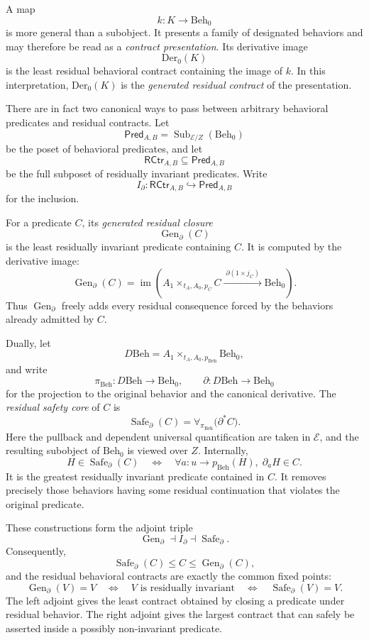A map
\[
  k:K\to \mathrm{Beh}_0
\]
is more general than a subobject.  It presents a family of designated
behaviors and may therefore be read as a \emph{contract presentation}.  Its
derivative image
\[
  \mathrm{Der}_0(K)
\]
is the least residual behavioral contract containing the image of \(k\).  In
this interpretation, \(\mathrm{Der}_0(K)\) is the \emph{generated residual
contract} of the presentation.

There are in fact two canonical ways to pass between arbitrary behavioral
predicates and residual contracts.  Let
\[
  \mathsf{Pred}_{A,B}
  =
  \operatorname{Sub}_{\mathcal E/Z}(\mathrm{Beh}_0)
\]
be the poset of behavioral predicates, and let
\[
  \mathsf{RCtr}_{A,B}
  \subseteq
  \mathsf{Pred}_{A,B}
\]
be the full subposet of residually invariant predicates.  Write
\[
  I_{\partial}:
  \mathsf{RCtr}_{A,B}
  \hookrightarrow
  \mathsf{Pred}_{A,B}
\]
for the inclusion.

For a predicate \(C\), its \emph{generated residual closure}
\[
  \operatorname{Gen}_{\partial}(C)
\]
is the least residually invariant predicate containing \(C\).  It is computed
by the derivative image:
\[
  \operatorname{Gen}_{\partial}(C)
  =
  \operatorname{im}
  \left(
    A_1\times_{t_A,A_0,p_C}C
    \xrightarrow{\;\partial(1\times j_C)\;}
    \mathrm{Beh}_0
  \right).
\]
Thus \(\operatorname{Gen}_{\partial}\) freely adds every residual consequence
forced by the behaviors already admitted by \(C\).

Dually, let
\[
  D\mathrm{Beh}
  =
  A_1\times_{t_A,A_0,p_{\mathrm{Beh}}}\mathrm{Beh}_0,
\]
and write
\[
  \pi_{\mathrm{Beh}}:D\mathrm{Beh}\to\mathrm{Beh}_0,
  \qquad
  \partial:D\mathrm{Beh}\to\mathrm{Beh}_0
\]
for the projection to the original behavior and the canonical derivative.
The \emph{residual safety core} of \(C\) is
\[
  \operatorname{Safe}_{\partial}(C)
  =
  \forall_{\pi_{\mathrm{Beh}}}\bigl(\partial^\ast C\bigr).
\]
Here the pullback and dependent universal quantification are taken in
\(\mathcal E\), and the resulting subobject of \(\mathrm{Beh}_0\) is viewed
over \(Z\).  Internally,
\[
  H\in\operatorname{Safe}_{\partial}(C)
  \quad\Longleftrightarrow\quad
  \forall a:u\to p_{\mathrm{Beh}}(H),\;
  \partial_aH\in C.
\]
It is the greatest residually invariant predicate contained in \(C\).  It
removes precisely those behaviors having some residual continuation that
violates the original predicate.

These constructions form the adjoint triple
\[
  \boxed{
  \operatorname{Gen}_{\partial}
  \dashv
  I_{\partial}
  \dashv
  \operatorname{Safe}_{\partial}.
  }
\]
Consequently,
\[
  \operatorname{Safe}_{\partial}(C)
  \leq
  C
  \leq
  \operatorname{Gen}_{\partial}(C),
\]
and the residual behavioral contracts are exactly the common fixed points:
\[
  \operatorname{Gen}_{\partial}(V)=V
  \quad\Longleftrightarrow\quad
  V\text{ is residually invariant}
  \quad\Longleftrightarrow\quad
  \operatorname{Safe}_{\partial}(V)=V.
\]
The left adjoint gives the least contract obtained by closing a predicate
under residual behavior.  The right adjoint gives the largest contract that
can safely be asserted inside a possibly non-invariant predicate.

